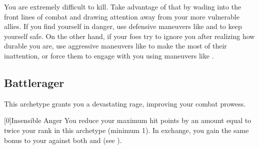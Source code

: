              You are extremely difficult to kill.
            Take advantage of that by wading into the front lines of combat and drawing attention away from your more vulnerable allies.
            If you find yourself in danger, use defensive maneuvers like  and  to keep yourself safe.
            On the other hand, if your foes try to ignore you after realizing how durable you are, use aggressive maneuvers like  to make the most of their inattention, or force them to engage with you using maneuvers like .

    \newpage
    \subsection{Battlerager}\label{Rage}
        This archetype grants you a devastating rage, improving your combat prowess.

        [0]{Insensible Anger} You reduce your maximum hit points by an amount equal to twice your rank in this archetype (minimum 1).
        In exchange, you gain the same bonus to your  against both  and  (see ).


